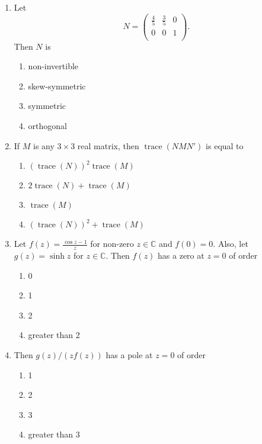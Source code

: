 \documentclass[journal]{IEEEtran}
\numberwithin{equation}{enumi}
\numberwithin{figure}{enumi}
\begin{document}
\begin{enumerate}
\item
Let
\[
N =
\begin{pmatrix}
\frac{4}{5} & \frac{3}{5} & 0 \\
0 & 0 & 1 \\
\end{pmatrix}.
\]
Then $N$ is
\hfill{}
\begin{multicols}{2}
\begin{enumerate}
    \item non-invertible
    \item skew-symmetric
    \item symmetric
    \item orthogonal
\end{enumerate}
\end{multicols}

\item
If $M$ is any $3 \times 3$ real matrix, then $\operatorname{trace}(N M N')$ is equal to
\hfill{}
\begin{multicols}{2}
\begin{enumerate}
    \item $(\operatorname{trace}(N))^2 \operatorname{trace}(M)$
    \item $2 \operatorname{trace}(N) + \operatorname{trace}(M)$
    \item $\operatorname{trace}(M)$
    \item $(\operatorname{trace}(N))^2 + \operatorname{trace}(M)$
\end{enumerate}
\end{multicols}

\item
Let $f(z) = \frac{\cos z - 1}{z}$ for non-zero $z \in \mathbb{C}$ and $f(0) = 0$. Also, let $g(z) = \sinh z$ for $z \in \mathbb{C}$. Then $f(z)$ has a zero at $z=0$ of order
\hfill{}
\begin{multicols}{4}
\begin{enumerate}
    \item 0
    \item 1
    \item 2
    \item greater than 2
\end{enumerate}
\end{multicols}

\item
Then $g(z)/ (z f(z))$ has a pole at $z=0$ of order
\hfill{}
\begin{multicols}{4}
\begin{enumerate}
    \item 1
    \item 2
    \item 3
    \item greater than 3
\end{enumerate}
\end{multicols}


\end{enumerate}
\end{document}
